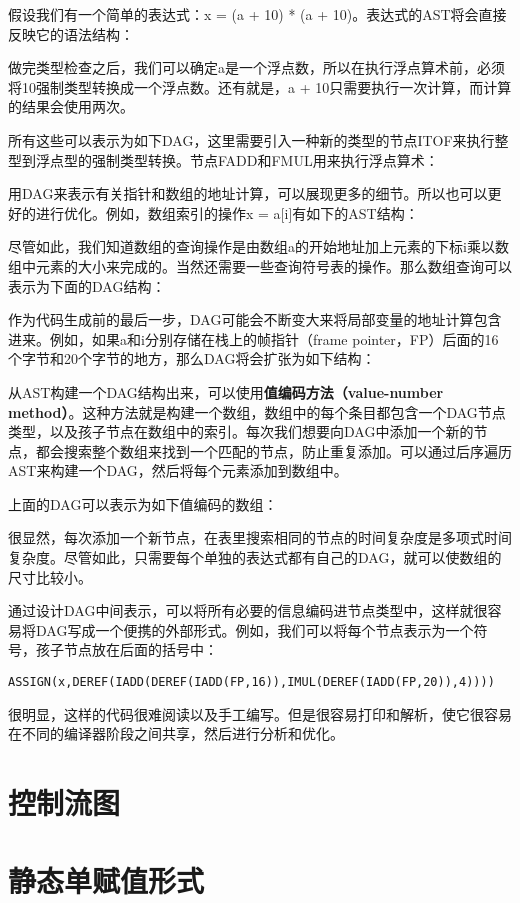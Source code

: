 \documentclass[cn,11pt,chinese]{elegantbook}
\begin{document}
假设我们有一个简单的表达式：x = (a + 10) * (a + 10)。表达式的AST将会直接反映它的语法结构：

做完类型检查之后，我们可以确定a是一个浮点数，所以在执行浮点算术前，必须将10强制类型转换成一个浮点数。还有就是，a + 10只需要执行一次计算，而计算的结果会使用两次。

所有这些可以表示为如下DAG，这里需要引入一种新的类型的节点ITOF来执行整型到浮点型的强制类型转换。节点FADD和FMUL用来执行浮点算术：

用DAG来表示有关指针和数组的地址计算，可以展现更多的细节。所以也可以更好的进行优化。例如，数组索引的操作x = a[i]有如下的AST结构：

尽管如此，我们知道数组的查询操作是由数组a的开始地址加上元素的下标i乘以数组中元素的大小来完成的。当然还需要一些查询符号表的操作。那么数组查询可以表示为下面的DAG结构：

作为代码生成前的最后一步，DAG可能会不断变大来将局部变量的地址计算包含进来。例如，如果a和i分别存储在栈上的帧指针（frame pointer，FP）后面的16个字节和20个字节的地方，那么DAG将会扩张为如下结构：

从AST构建一个DAG结构出来，可以使用\textbf{值编码方法（value-number method）}。这种方法就是构建一个数组，数组中的每个条目都包含一个DAG节点类型，以及孩子节点在数组中的索引。每次我们想要向DAG中添加一个新的节点，都会搜索整个数组来找到一个匹配的节点，防止重复添加。可以通过后序遍历AST来构建一个DAG，然后将每个元素添加到数组中。

上面的DAG可以表示为如下值编码的数组：

很显然，每次添加一个新节点，在表里搜索相同的节点的时间复杂度是多项式时间复杂度。尽管如此，只需要每个单独的表达式都有自己的DAG，就可以使数组的尺寸比较小。

通过设计DAG中间表示，可以将所有必要的信息编码进节点类型中，这样就很容易将DAG写成一个便携的外部形式。例如，我们可以将每个节点表示为一个符号，孩子节点放在后面的括号中：

\begin{verbatim}
ASSIGN(x,DEREF(IADD(DEREF(IADD(FP,16)),IMUL(DEREF(IADD(FP,20)),4))))
\end{verbatim}

很明显，这样的代码很难阅读以及手工编写。但是很容易打印和解析，使它很容易在不同的编译器阶段之间共享，然后进行分析和优化。

\section{控制流图}

\section{静态单赋值形式}
\end{document}
